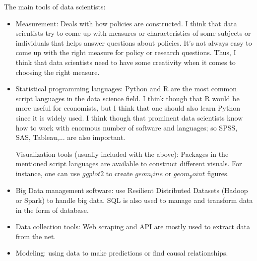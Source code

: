 \documentclass[12pt]{article}
\theoremstyle{definition}
\begin{document}
The main tools of data scientists:
\begin{itemize}
    \item Measurement: Deals with how policies are constructed. I think that data scientists try to come up with measures or characteristics of some subjects or individuals that helps answer questions about policies. It's not always easy to come up with the right measure for policy or research questions. Thus, I think that data scientists need to have some creativity when it comes to choosing the right measure. 
    
    \item Statistical programming languages: Python and R are the most common script languages in the data science field. I think though that R would be more useful for economists, but I think that one should also learn Python since it is widely used. I think though that prominent data scientists know how to work with enormous number of software and languages; so SPSS, SAS, Tableau,... are also important. 
    
    \itme Visualization tools (usually included with the above):  Packages in the mentioned script languages are available to construct different visuals. For instance, one can use $ggplot2$ to create $geom_line$ or $geom_point$ figures. 
    
    \item Big Data management software: use Resilient Distributed Datasets (Hadoop or Spark) to handle big data. SQL is also used to manage and transform data in the form of database.
    
    \item Data collection tools: Web scraping and API are mostly used to extract data from the net.
    
    \item Modeling: using data to make predictions or find causal relationships. 
    
\end{itemize}
\end{document}
